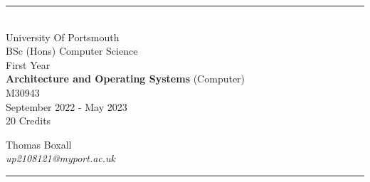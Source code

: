 \documentclass[a4paper, 11pt]{report}
\begin{document}
\begin{titlepage}
    \rule{\textwidth}{1px}
    \vspace{0.025\textheight}\\
    \huge{University Of Portsmouth}\\
    \huge{BSc (Hons) Computer Science}\\
    \huge{First Year}\\
    \vfill
    \LARGE{\textbf{Architecture and Operating Systems} (Computer)}\\
    \Large{M30943}\\
    \large{September 2022 - May 2023}\\
    \large{20 Credits}
    \vfill

    
    \begin{FlushRight}
        \large{Thomas Boxall}\\
        \textit{up2108121@myport.ac.uk}\\
        
    \end{FlushRight}
    \vspace{0.2\textheight}
    \rule{\textwidth}{1px}
    
\end{titlepage}

\tableofcontents




\end{document}
